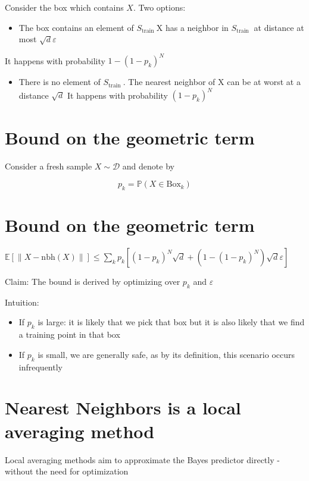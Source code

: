 Consider the box which contains $X$. Two options:

\begin{itemize}
  \item The box contains an element of $S_{\text {train }} \mathrm{X}$ has a neighbor in $S_{\text {train }}$ at distance at most $\sqrt{d} \varepsilon$
\end{itemize}

It happens with probability $1-\left(1-p_{k}\right)^{N}$

\begin{itemize}
  \item There is no element of $S_{\text {train }}$. The nearest neighbor of $\mathrm{X}$ can be at worst at a distance $\sqrt{d}$ It happens with probability $\left(1-p_{k}\right)^{N}$
\end{itemize}


\section*{Bound on the geometric term}
Consider a fresh sample $X \sim \mathscr{D}$ and denote by

$$
p_{k}=\mathbb{P}\left(X \in \mathrm{Box}_{k}\right)
$$


\section*{Bound on the geometric term}
$\mathbb{E}[\|X-\mathrm{nbh}(X)\|] \leq \sum_{k} p_{k}\left[\left(1-p_{k}\right)^{N} \sqrt{d}+\left(1-\left(1-p_{k}\right)^{N}\right) \sqrt{d} \varepsilon\right]$

Claim: The bound is derived by optimizing over $p_{k}$ and $\varepsilon$

Intuition:

\begin{itemize}
  \item If $p_{k}$ is large: it is likely that we pick that box but it is also likely that we find a training point in that box
  \item If $p_{k}$ is small, we are generally safe, as by its definition, this scenario occurs infrequently
\end{itemize}


\section*{Nearest Neighbors is a local averaging method}
Local averaging methods aim to approximate the Bayes predictor directly - without the need for optimization

